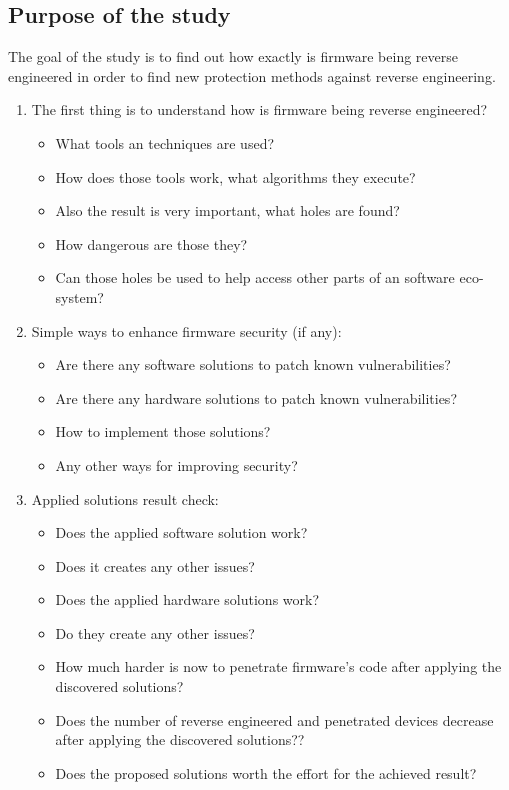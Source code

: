 \documentclass[]{report}
\begin{document}
\subsection{Purpose of the study} 
The goal of the study is to find out how exactly is firmware being reverse engineered in order to find new protection methods against reverse engineering.
\begin{enumerate}
	\item The first thing is to understand how is firmware being reverse engineered? 
 	\begin{itemize}
 	\item What tools an techniques are used? 
 	\item How does those tools work, what algorithms they execute? 
 	\item Also the result is very important, what holes are found? 
 	\item How dangerous are those they? 
 	\item Can those holes be used to help access other parts of an software eco-system?
 	\end{itemize}

	\item Simple ways to enhance firmware security (if any):
	\begin{itemize}
	\item Are there any software solutions to patch known vulnerabilities?
	\item Are there any hardware solutions to patch known vulnerabilities?
	\item How to implement those solutions?
	\item Any other ways for improving security?
	\end{itemize}

\item Applied solutions result check:
\begin{itemize}
\item Does the applied software solution work?
\item Does it creates any other issues?
\item Does the applied hardware solutions work?
\item Do they create any other issues?
\item How much harder is now to penetrate firmware's code after applying the discovered solutions?
\item Does the number of reverse engineered and penetrated devices decrease after applying the discovered solutions??
\item Does the proposed solutions worth the effort for the achieved result?
\end{itemize}
\end{enumerate}
\end{document}
